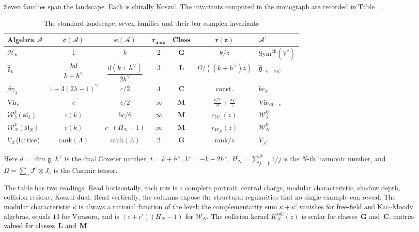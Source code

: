 \documentclass[11pt,reqno]{amsart}
\makeatletter
\theoremstyle{definition}
\theoremstyle{remark}
\providecommand{\cA}{\mathcal{A}}
\providecommand{\cH}{\mathcal{H}}
\providecommand{\cW}{\mathcal{W}}
\providecommand{\fg}{\mathfrak{g}}
\providecommand{\Sym}{\mathrm{Sym}}
\providecommand{\Vir}{\mathrm{Vir}}
\numberwithin{equation}{section}
\let\ps@oldref\ref
\renewcommand{\ref}[1]{%
 \@ifundefined{r@#1}{\textit{full monograph}}{\ps@oldref{#1}}%
}
\makeatother
\begin{document}
Seven families span the landscape. Each is chirally
Koszul. The invariants computed in the monograph are
recorded in Table~\ref{tab:census}.

\begin{table}[ht]
\centering
\caption{The standard landscape: seven families and their
 bar-complex invariants}
\label{tab:census}
\renewcommand{\arraystretch}{1.7}
{\small
\begin{tabular}{lcccccl}
\toprule
\textbf{Algebra $\cA$}
 & $\boldsymbol{c(\cA)}$
 & $\boldsymbol{\kappa(\cA)}$
 & $\boldsymbol{r_{\max}}$
 & \textbf{Class}
 & $\boldsymbol{r(z)}$
 & $\boldsymbol{\cA^!}$ \\
\midrule
$\cH_k$
 & $1$
 & $k$
 & $2$ & $\mathbf{G}$
 & $k/z$
 & $\Sym^{\mathrm{ch}}(V^*)$ \\[2pt]
$\widehat{\fg}_k$
 & $\dfrac{kd}{k+h^\vee}$
 & $\dfrac{d(k+h^\vee)}{2h^\vee}$
 & $3$ & $\mathbf{L}$
 & $\Omega/((k{+}h^\vee)z)$
 & $\widehat{\fg}_{-k-2h^\vee}$ \\[6pt]
$\beta\gamma_\lambda$
 & $1-3(2\lambda{-}1)^2$
 & $c/2$
 & $4$ & $\mathbf{C}$
 & const.
 & $bc_\lambda$ \\[2pt]
$\Vir_c$
 & $c$
 & $c/2$
 & $\infty$ & $\mathbf{M}$
 & $\frac{c/2}{z^3} + \frac{2T}{z}$
 & $\Vir_{26-c}$ \\[4pt]
$\cW^k_3(\mathfrak{sl}_3)$
 & $c(k)$
 & $5c/6$
 & $\infty$ & $\mathbf{M}$
 & $r_{\cW_3}(z)$
 & $\cW^{k'}_3$ \\[2pt]
$\cW^k_N(\mathfrak{sl}_N)$
 & $c(k)$
 & $c \cdot (H_N{-}1)$
 & $\infty$ & $\mathbf{M}$
 & $r_{\cW_N}(z)$
 & $\cW^{k'}_N$ \\[2pt]
$V_\Lambda$\,(lattice)
 & $\mathrm{rank}(\Lambda)$
 & $\mathrm{rank}(\Lambda)$
 & $2$ & $\mathbf{G}$
 & $\mathrm{rank}/z$
 & $V_{\Lambda^*}$ \\
\bottomrule
\end{tabular}
}
\end{table}

\noindent
Here $d = \dim\fg$, $h^\vee$ is the dual Coxeter number,
$t = k + h^\vee$, $k' = -k - 2h^\vee$,
$H_N = \sum_{j=1}^{N} 1/j$ is the $N$-th harmonic number,
and $\Omega = \sum_a J^a \otimes J_a$ is the Casimir tensor.

The table has two readings. Read horizontally, each row is
a complete portrait: central charge, modular characteristic,
shadow depth, collision residue, Koszul dual. Read
vertically, the columns expose the structural regularities
that no single example can reveal. The modular characteristic
$\kappa$ is always a rational function of the level;
the complementarity sum $\kappa + \kappa^!$ vanishes for
free-field and Kac--Moody algebras, equals $13$ for
Virasoro, and is $(c + c')(H_N - 1)$ for
$\cW_N$. The collision kernel $K_\cA^{\mathrm{coll}}(z)$ is scalar for
classes~$\mathbf{G}$ and~$\mathbf{C}$, matrix-valued for
classes~$\mathbf{L}$ and~$\mathbf{M}$.
\end{document}
